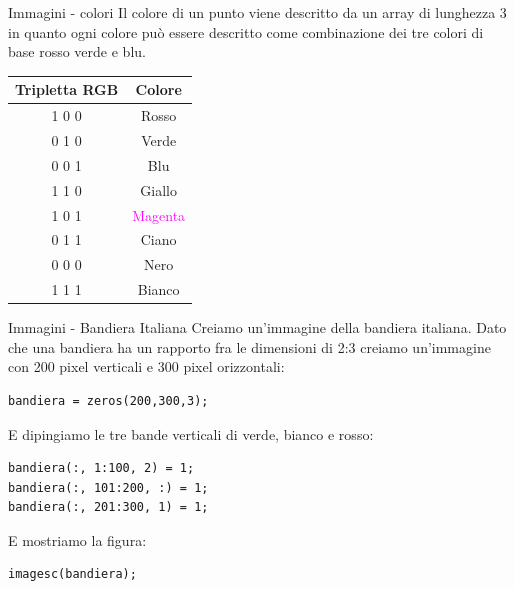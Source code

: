 \documentclass[format=169, handout]{beamer}
\begin{document}
\begin{frame}{Immagini - colori}
Il colore di un punto viene descritto da un array di lunghezza 3 in quanto ogni colore può essere descritto come combinazione dei tre colori di base rosso verde e blu.

\centering
\begin{tabular}{|c|c|}
	\hline 
	Tripletta RGB & Colore \\ 
	\hline 
	1 0 0 & \textcolor{rosso}{Rosso} \\ 
	0 1 0 & \textcolor{verde}{Verde} \\ 
	0 0 1 & \textcolor{blu}{Blu} \\ 
	1 1 0 & \textcolor{giallo}{Giallo} \\ 
	1 0 1 & \textcolor{magenta}{Magenta} \\
	0 1 1 & \textcolor{ciano}{Ciano} \\ 
	0 0 0 & Nero \\ 
	1 1 1 & Bianco \\ 
	\hline 
\end{tabular} 
\end{frame}

\begin{frame}[fragile]{Immagini - Bandiera Italiana}
Creiamo un'immagine della bandiera italiana.
Dato che una bandiera ha un rapporto fra le dimensioni di 2:3 creiamo un'immagine con 200 pixel verticali e 300 pixel orizzontali:
\begin{lstlisting}[style=matlab]
bandiera = zeros(200,300,3);
\end{lstlisting}

E dipingiamo le tre bande verticali di verde, bianco e rosso:
\begin{lstlisting}[style=matlab, firstnumber=2]
bandiera(:, 1:100, 2) = 1;
bandiera(:, 101:200, :) = 1;
bandiera(:, 201:300, 1) = 1;
\end{lstlisting}

E mostriamo la figura:
\begin{lstlisting}[style=matlab, firstnumber=5]
imagesc(bandiera);
\end{lstlisting}
\end{frame}
\end{document}
